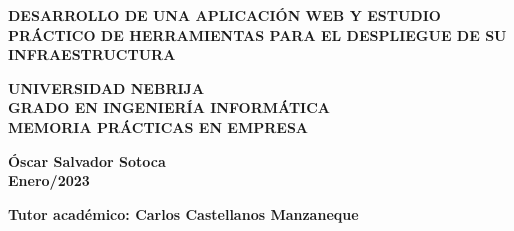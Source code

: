 \documentclass[11pt]{article}
\begin{document}
		\begin{titlepage}
		{\color{white}{.}}
		\linebreak
		\linebreak
		
		\centering
		\linebreak
		\vspace{3cm}
		
		{\LARGE\textbf{\color{RojoNebrija}DESARROLLO DE UNA APLICACIÓN WEB Y ESTUDIO PRÁCTICO DE HERRAMIENTAS PARA EL DESPLIEGUE DE SU INFRAESTRUCTURA}\par}
		\vspace{2cm}
		
		{\Large \textbf{\color{black}UNIVERSIDAD NEBRIJA \\ GRADO EN INGENIERÍA INFORMÁTICA \\ MEMORIA PRÁCTICAS EN EMPRESA}\par}
		\vspace{2cm}
		

		{\Large \textbf{ Óscar Salvador Sotoca\\ Enero/2023}\par}
		\vspace{2cm}

		{\Large \textbf{Tutor académico: Carlos Castellanos Manzaneque}\par}
		\vspace{2cm}
						
	\end{titlepage}


\tableofcontents

\clearpage
\listoffigures

\renewcommand{\listtablename}{Índice de tablas}
\renewcommand{\tablename}{Tabla} 
\listoftables

\clearpage
\printnoidxglossary[type=\acronymtype, sort=standard, style=mcolindex , title=Acrónimos]

\clearpage
\setlength{\glsdescwidth}{.7\linewidth}
\printnoidxglossary[sort=standard, style=long3col]
\end{document}
